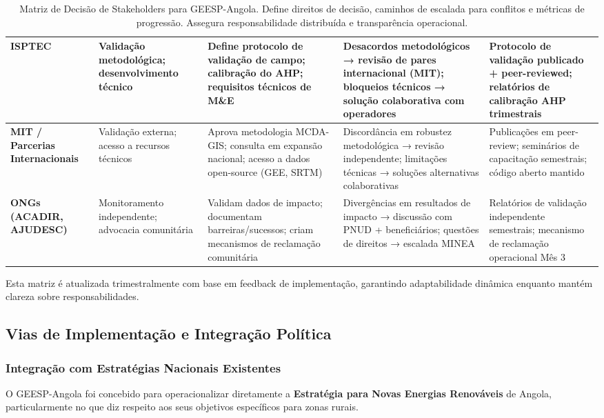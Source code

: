 \documentclass[12pt, a4paper]{article}
\begin{document}
\begin{table}[h!]
\begin{tabularx}{\textwidth}{|l|l|l|l|l|}
\hline
\textbf{ISPTEC} & Validação metodológica; desenvolvimento técnico & Define protocolo de validação de campo; calibração do AHP; requisitos técnicos de M\&E & Desacordos metodológicos → revisão de pares internacional (MIT); bloqueios técnicos → solução colaborativa com operadores & Protocolo de validação publicado + peer-reviewed; relatórios de calibração AHP trimestrais \\
\hline
\textbf{MIT / Parcerias Internacionais} & Validação externa; acesso a recursos técnicos & Aprova metodologia MCDA-GIS; consulta em expansão nacional; acesso a dados open-source (GEE, SRTM) & Discordância em robustez metodológica → revisão independente; limitações técnicas → soluções alternativas colaborativas & Publicações em peer-review; seminários de capacitação semestrais; código aberto mantido \\
\hline
\textbf{ONGs (ACADIR, AJUDESC)} & Monitoramento independente; advocacia comunitária & Validam dados de impacto; documentam barreiras/sucessos; criam mecanismos de reclamação comunitária & Divergências em resultados de impacto → discussão com PNUD + beneficiários; questões de direitos → escalada MINEA & Relatórios de validação independente semestrais; mecanismo de reclamação operacional Mês 3 \\
\hline
\end{tabularx}
\caption{Matriz de Decisão de Stakeholders para GEESP-Angola. Define direitos de decisão, caminhos de escalada para conflitos e métricas de progressão. Assegura responsabilidade distribuída e transparência operacional.}
\label{tab:stakeholder_decisions}
\end{table}

Esta matriz é atualizada trimestralmente com base em feedback de implementação, garantindo adaptabilidade dinâmica enquanto mantém clareza sobre responsabilidades.


\subsection{Vias de Implementação e Integração Política}

\subsubsection{Integração com Estratégias Nacionais Existentes}

O GEESP-Angola foi concebido para operacionalizar diretamente a \textbf{Estratégia para Novas Energias Renováveis} de Angola, particularmente no que diz respeito aos seus objetivos específicos para zonas rurais.
\end{document}

